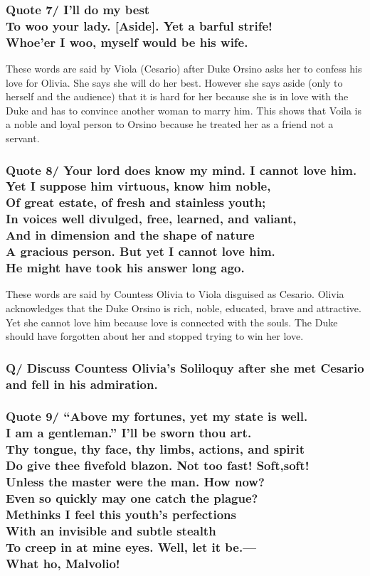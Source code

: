 \documentclass[12pt, a4paper]{article}
\begin{document}
\subsubsection*{Quote 7/
I’ll do my best\\
To woo your lady. [Aside]. Yet a barful strife!\\
Whoe’er I woo, myself would be his wife.
}

These words are said by Viola (Cesario) after Duke Orsino asks her
to confess his love for Olivia. She says she will do her best. However
she says aside (only to herself and the audience) that it is hard for
her because she is in love with the Duke and has to convince another 
woman to marry him. This shows that Voila is a noble and loyal
person to Orsino because he treated her as a friend not a servant.

\subsubsection*{Quote 8/
Your lord does know my mind. I cannot love him.\\
Yet I suppose him virtuous, know him noble,\\
Of great estate, of fresh and stainless youth;\\
In voices well divulged, free, learned, and valiant,\\
And in dimension and the shape of nature\\
A gracious person. But yet I cannot love him.\\
He might have took his answer long ago.
}

These words are said by Countess Olivia to Viola disguised as Cesario.
Olivia acknowledges that the Duke Orsino is rich, noble, educated, brave 
and attractive. Yet she cannot love him because love is connected with
the souls. The Duke should have forgotten about her and stopped trying 
to win her love.

\subsubsection*{Q/ Discuss Countess Olivia's Soliloquy after she met
Cesario and fell in his admiration.}

\subsubsection*{Quote 9/
“Above my fortunes, yet my state is well.\\
I am a gentleman.” I’ll be sworn thou art.\\
Thy tongue, thy face, thy limbs, actions, and spirit\\
Do give thee fivefold blazon. Not too fast! Soft,soft!\\
Unless the master were the man. How now?\\
Even so quickly may one catch the plague?\\
Methinks I feel this youth’s perfections\\
With an invisible and subtle stealth\\
To creep in at mine eyes. Well, let it be.—\\
What ho, Malvolio!
}
\end{document}
